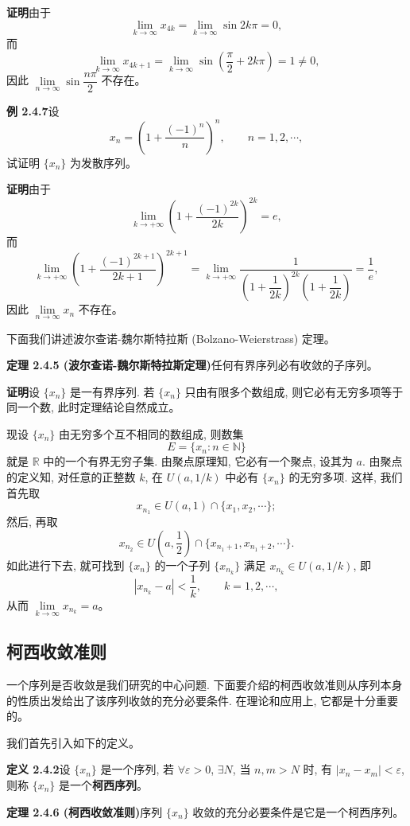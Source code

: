 \documentclass[UTF8,12pt,a4paper,fontset=fandol]{ctexart}
\begin{document}
\noindent\textbf{证明}\quad 由于
\[
  \lim_{k\to\infty}x_{4k}
  =
  \lim_{k\to\infty}\sin2k\pi=0,
\]
而
\[
  \lim_{k\to\infty}x_{4k+1}
  =
  \lim_{k\to\infty}\sin\left(\frac\pi2+2k\pi\right)=1\ne0,
\]
因此 $\lim\limits_{n\to\infty}\sin\dfrac{n\pi}{2}$ 不存在。

\noindent\textbf{例 2.4.7}\quad 设
\[
  x_n=\left(1+\frac{(-1)^n}{n}\right)^n,\qquad n=1,2,\cdots,
\]
试证明 $\{x_n\}$ 为发散序列。

\noindent\textbf{证明}\quad 由于
\[
  \lim_{k\to+\infty}\left(1+\frac{(-1)^{2k}}{2k}\right)^{2k}=e,
\]
而
\[
  \lim_{k\to+\infty}\left(1+\frac{(-1)^{2k+1}}{2k+1}\right)^{2k+1}
  =
  \lim_{k\to+\infty}\frac1{\left(1+\dfrac1{2k}\right)^{2k}\left(1+\dfrac1{2k}\right)}
  =
  \frac1e,
\]
因此 $\lim\limits_{n\to\infty}x_n$ 不存在。

下面我们讲述波尔查诺-魏尔斯特拉斯 (Bolzano-Weierstrass) 定理。

\noindent\textbf{定理 2.4.5 (波尔查诺-魏尔斯特拉斯定理)}\quad 任何有界序列必有收敛的子序列。

\noindent\textbf{证明}\quad 设 $\{x_n\}$ 是一有界序列. 若 $\{x_n\}$ 只由有限多个数组成, 则它必有无穷多项等于同一个数, 此时定理结论自然成立。

现设 $\{x_n\}$ 由无穷多个互不相同的数组成, 则数集
\[
  E=\{x_n:n\in\mathbb{N}\}
\]
就是 $\mathbb{R}$ 中的一个有界无穷子集. 由聚点原理知, 它必有一个聚点, 设其为 $a$. 由聚点的定义知, 对任意的正整数 $k$, 在 $U(a,1/k)$ 中必有 $\{x_n\}$ 的无穷多项. 这样, 我们首先取
\[
  x_{n_1}\in U(a,1)\cap\{x_1,x_2,\cdots\};
\]
然后, 再取
\[
  x_{n_2}\in U\left(a,\frac12\right)\cap\{x_{n_1+1},x_{n_1+2},\cdots\}.
\]
如此进行下去, 就可找到 $\{x_n\}$ 的一个子列 $\{x_{n_k}\}$ 满足 $x_{n_k}\in U(a,1/k)$, 即
\[
  |x_{n_k}-a|<\frac1k,\qquad k=1,2,\cdots,
\]
从而 $\lim\limits_{k\to\infty}x_{n_k}=a$。

\subsection{柯西收敛准则}

一个序列是否收敛是我们研究的中心问题. 下面要介绍的柯西收敛准则从序列本身的性质出发给出了该序列收敛的充分必要条件. 在理论和应用上, 它都是十分重要的。

我们首先引入如下的定义。

\noindent\textbf{定义 2.4.2}\quad 设 $\{x_n\}$ 是一个序列, 若 $\forall\varepsilon>0$, $\exists N$, 当 $n,m>N$ 时, 有 $|x_n-x_m|<\varepsilon$, 则称 $\{x_n\}$ 是一个\textbf{柯西序列}。

\noindent\textbf{定理 2.4.6 (柯西收敛准则)}\quad 序列 $\{x_n\}$ 收敛的充分必要条件是它是一个柯西序列。
\end{document}
